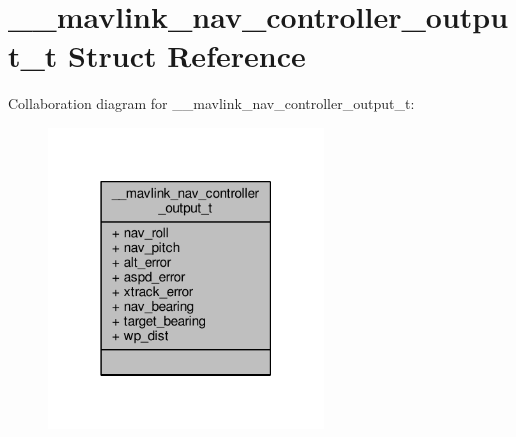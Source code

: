\hypertarget{struct____mavlink__nav__controller__output__t}{\section{\+\_\+\+\_\+mavlink\+\_\+nav\+\_\+controller\+\_\+output\+\_\+t Struct Reference}
\label{struct____mavlink__nav__controller__output__t}
}


Collaboration diagram for \+\_\+\+\_\+mavlink\+\_\+nav\+\_\+controller\+\_\+output\+\_\+t\+:
\nopagebreak
\begin{figure}[H]
\begin{center}
\leavevmode
\includegraphics[width=207pt]{struct____mavlink__nav__controller__output__t__coll__graph}
\end{center}
\end{figure}

